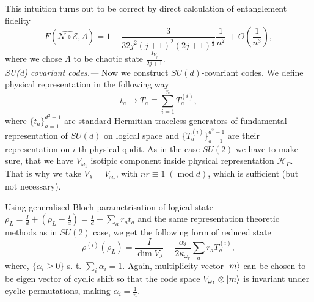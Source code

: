 \documentclass[twocolumn,superscriptaddress,aps,showpacs,amsmath,amstex,amssymb,citeautoscript,floatfix,pra,preprintnumbers]{revtex4-2}
\theoremstyle{plain}
\theoremstyle{plain}
\theoremstyle{plain}
\theoremstyle{plain}
\theoremstyle{plain}
\theoremstyle{plain}
\begin{document}
This intuition turns out to be correct by direct calculation of entanglement fidelity
\[
    F(\widehat{\mathcal{N} \circ \mathcal{E}}, \Lambda)=1-\frac{3}{32j^2(j+1)^2(2j+1)^{\frac{1}{2}}}\frac{1}{n^2}\ +O\left(\frac{1}{n^3}\right),
\]
where we chose $\Lambda$ to be chaotic state $\frac{I_{V_j}}{2 j+1}$.\\
\textit{SU(d) covariant codes.---} 
Now we construct $SU(d)$-covariant codes. We define physical representation in the following way
\[
    t_a \rightarrow T_a \equiv \sum_{i=1}^n T_a^{(i)},
\]
where $\{t_a\}_{a=1}^{d^2-1}$ are standard Hermitian traceless generators of fundamental representation of $SU(d)$ on logical space and $\{T_a^{(i)}\}_{a=1}^{d^2-1}$ are their representation on $i$-th physical qudit. As in the case $SU(2)$ we have to make sure, that we have $V_{\omega_1}$ isotipic component inside physical representation $\mathcal{H}_P$. That is why we take $V_{\lambda}=V_{\omega_r}$, with $nr\equiv 1\;(\operatorname{mod} d)$, which is sufficient (but not necessary).

Using generalised Bloch parametrisation of logical state $\rho_L=\frac{I}{d}+\left(\rho_L-\frac{I}{d}\right)=\frac{I}{d}+\sum_a r_a t_a$ and the same representation theoretic methods as in $SU(2)$ case, we get the following form of reduced state
\[
    \rho^{(i)}\left(\rho_L\right) = \frac{I}{\operatorname{dim} V_\lambda}+\frac{\alpha_i}{2 \kappa_{\omega_r}} \sum_a r_a T_a^{(i)},
\]
where, $\{\alpha_i\geq 0\}$ s. t. $\sum_i\alpha_i=1$. Again, multiplicity vector $\ket{m}$ can be chosen to be eigen vector of cyclic shift so that the code space $V_{\omega_1}\otimes \ket{m}$ is invariant under cyclic permutations, making $\alpha_i=\frac{1}{n}$.
\end{document}
